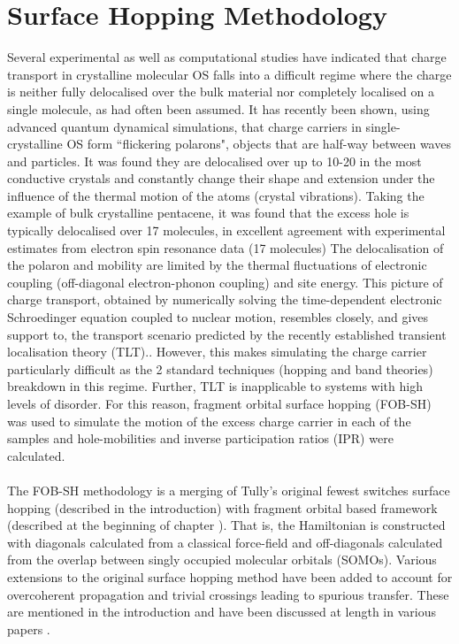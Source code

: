 \section{Surface Hopping Methodology}
Several experimental as well as computational studies have indicated that charge transport in crystalline molecular OS falls into a difficult regime where the charge is neither fully delocalised over the bulk material nor completely localised on a single molecule, as had often been assumed.\cite{Vehoff2010,Deng2004,Kwiatkowski2009,Athanasopoulos2007,Vehoff2010_2,Kordt2016,Zhang2019} It has recently been shown, using advanced quantum dynamical simulations, that charge carriers in single-crystalline OS form ``flickering polarons", objects that are half-way between waves and particles\cite{FlickPolarons,Giannini2019,Ziogos20}. It was found they are delocalised over up to 10-20 in the most conductive crystals and constantly change their shape and extension under the influence of the thermal motion of the atoms (crystal vibrations).  Taking the example of bulk crystalline pentacene, it was found that the excess hole is typically delocalised over 17 molecules, in excellent agreement with experimental estimates from electron spin resonance data (17 molecules) The delocalisation of the polaron and mobility are limited by the thermal fluctuations of electronic coupling (off-diagonal electron-phonon coupling) and site energy. This picture of charge transport, obtained by numerically solving the time-dependent electronic Schroedinger equation coupled to nuclear motion, resembles closely, and gives support to, the transport scenario predicted by the recently established transient localisation theory (TLT).\cite{Nematiaram2019,PhysRevB.83.081202}. However, this makes simulating the charge carrier particularly difficult as the 2 standard techniques (hopping and band theories) breakdown in this regime. Further, TLT is inapplicable to systems with high levels of disorder. For this reason, fragment orbital surface hopping (FOB-SH) was used to simulate the motion of the excess charge carrier in each of the samples and hole-mobilities and inverse participation ratios (IPR) were calculated.
\\\\
The FOB-SH methodology is a merging of Tully's original fewest switches surface hopping (described in the introduction) with fragment orbital based framework (described at the beginning of chapter \label{chap:molecular_systems}). That is, the Hamiltonian is constructed with diagonals calculated from a classical force-field and off-diagonals calculated from the overlap between singly occupied molecular orbitals (SOMOs). Various extensions to the original surface hopping method have been added to account for overcoherent propagation and trivial crossings leading to spurious transfer. These are mentioned in the introduction and have been discussed at length in various papers \cite{Giannini2018Crossover,Carof2017FSSH,C9FD00046A,C9CP04770K,C9TC05270D,FlickPolarons,FOB-SH_Spencer}.

